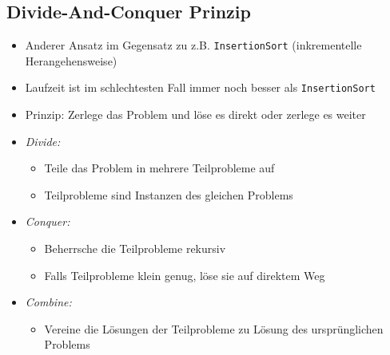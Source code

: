 \documentclass[
    ngerman,
    color=3b,
    load_common, %
    summary,
    boxarc,
]{tuda_summary}
\begin{document}
\subsection{Divide-And-Conquer Prinzip}\label{Divide-And-Conquer}
\begin{itemize}
    \item Anderer Ansatz im Gegensatz zu z.B. \texttt{InsertionSort} (inkrementelle Herangehensweise)
    \item Laufzeit ist im schlechtesten Fall immer noch besser als \texttt{InsertionSort}
    \item Prinzip: Zerlege das Problem und löse es direkt oder zerlege es weiter
    \item \textit{Divide:}
          \begin{itemize}
              \item Teile das Problem in mehrere Teilprobleme auf
              \item Teilprobleme sind Instanzen des gleichen Problems
          \end{itemize}
    \item \textit{Conquer:}
          \begin{itemize}
              \item Beherrsche die Teilprobleme rekursiv
              \item Falls Teilprobleme klein genug, löse sie auf direktem Weg
          \end{itemize}
    \item \textit{Combine:}
          \begin{itemize}
              \item Vereine die Lösungen der Teilprobleme zu Lösung des ursprünglichen Problems
          \end{itemize}
\end{itemize}
\clearpage
\end{document}
